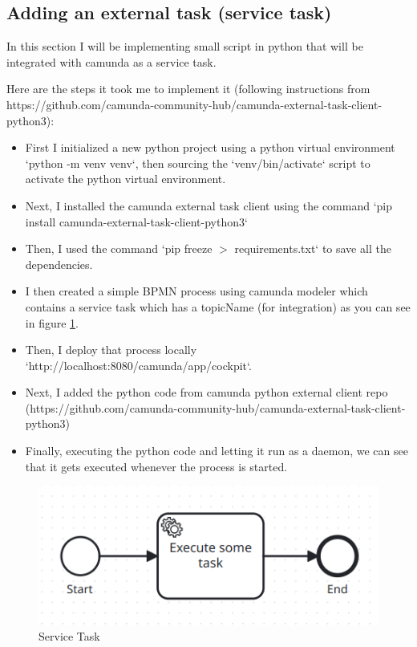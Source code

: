 \documentclass[12pt]{article}
\begin{document}
{  \subsection{Adding an external task (service task)}

In this section I will be implementing small script in python that will be integrated with camunda as a service task.

Here are the steps it took me to implement it (following instructions from https://github.com/camunda-community-hub/camunda-external-task-client-python3):

\begin{itemize}
  \item First I initialized a new python project using a python virtual environment `python -m venv venv`, then sourcing the `venv/bin/activate` script to activate the python virtual environment.
  \item Next, I installed the camunda external task client using the command `pip install camunda-external-task-client-python3`
  \item Then, I used the command `pip freeze $ > $ requirements.txt` to save all the dependencies.
  \item I then created a simple BPMN process using camunda modeler which contains a service task which has a topicName (for integration) as you can see in figure \ref{fig:service_task}.
  \item Then, I deploy that process locally `http://localhost:8080/camunda/app/cockpit`.
  \item Next, I added the python code from camunda python external client repo (https://github.com/camunda-community-hub/camunda-external-task-client-python3)
  \item Finally, executing the python code and letting it run as a daemon, we can see that it gets executed whenever the process is started.
\end{itemize}

\begin{figure}[h]
    \centering
    \includegraphics[width=.37\linewidth]{service_task.png}
    \caption{Service Task}
    \label{fig:service_task}
\end{figure}

\pagebreak

}
\end{document}
